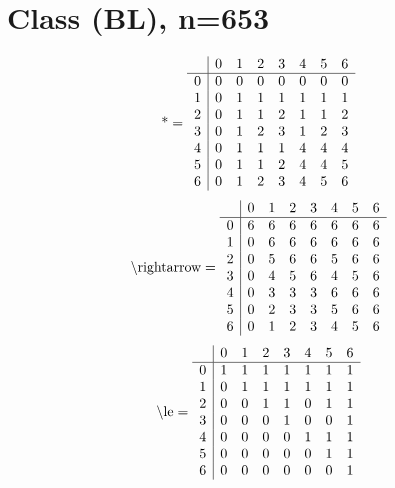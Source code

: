 \documentclass[11pt]{article}
\begin{document}
\section{Class (BL), n=653}
\[\text{*} = 
\begin{array}{r | r r r r r r r}
 & 0 & 1 & 2 & 3 & 4 & 5 & 6 \\ \hline
0 & 0 & 0 & 0 & 0 & 0 & 0 & 0 \\
1 & 0 & 1 & 1 & 1 & 1 & 1 & 1 \\
2 & 0 & 1 & 1 & 2 & 1 & 1 & 2 \\
3 & 0 & 1 & 2 & 3 & 1 & 2 & 3 \\
4 & 0 & 1 & 1 & 1 & 4 & 4 & 4 \\
5 & 0 & 1 & 1 & 2 & 4 & 4 & 5 \\
6 & 0 & 1 & 2 & 3 & 4 & 5 & 6 \\
\end{array}
\]
\[\text{\textbackslash rightarrow} = 
\begin{array}{r | r r r r r r r}
 & 0 & 1 & 2 & 3 & 4 & 5 & 6 \\ \hline
0 & 6 & 6 & 6 & 6 & 6 & 6 & 6 \\
1 & 0 & 6 & 6 & 6 & 6 & 6 & 6 \\
2 & 0 & 5 & 6 & 6 & 5 & 6 & 6 \\
3 & 0 & 4 & 5 & 6 & 4 & 5 & 6 \\
4 & 0 & 3 & 3 & 3 & 6 & 6 & 6 \\
5 & 0 & 2 & 3 & 3 & 5 & 6 & 6 \\
6 & 0 & 1 & 2 & 3 & 4 & 5 & 6 \\
\end{array}
\]
\[\text{\textbackslash le} = 
\begin{array}{r | r r r r r r r}
 & 0 & 1 & 2 & 3 & 4 & 5 & 6 \\ \hline
0 & 1 & 1 & 1 & 1 & 1 & 1 & 1 \\
1 & 0 & 1 & 1 & 1 & 1 & 1 & 1 \\
2 & 0 & 0 & 1 & 1 & 0 & 1 & 1 \\
3 & 0 & 0 & 0 & 1 & 0 & 0 & 1 \\
4 & 0 & 0 & 0 & 0 & 1 & 1 & 1 \\
5 & 0 & 0 & 0 & 0 & 0 & 1 & 1 \\
6 & 0 & 0 & 0 & 0 & 0 & 0 & 1 \\
\end{array}
\]
\end{document}
